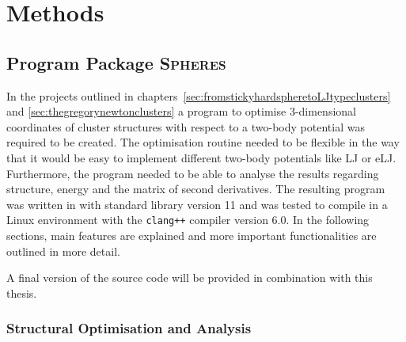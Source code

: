 
\part{Methods}
\label{sec:methods}

\chapter{Program Package \textsc{Spheres}}
\label{sec:theprogramspheres}

In the projects outlined in
chapters~\ref{sec:fromstickyhardspheretoLJtypeclusters} and
\ref{sec:thegregorynewtonclusters} a program to optimise 3-dimensional
coordinates of cluster structures with respect to a two-body potential was
required to be created. The optimisation routine needed to be flexible in the
way that it would be easy to implement different two-body potentials like
\ac{LJ} or \ac{eLJ}. Furthermore, the program needed to be able to analyse the
results regarding structure, energy and the matrix of second derivatives. The
resulting program was written in \Cpp with standard library version 11 and was
tested to compile in a Linux environment with the \texttt{clang++} compiler
version 6.0. In the following sections, main features are explained and more
important functionalities are outlined in more detail.

A final version of the source code will be provided in combination with this
thesis.

\section{Structural Optimisation and Analysis}
\label{sec:generalstructure}

